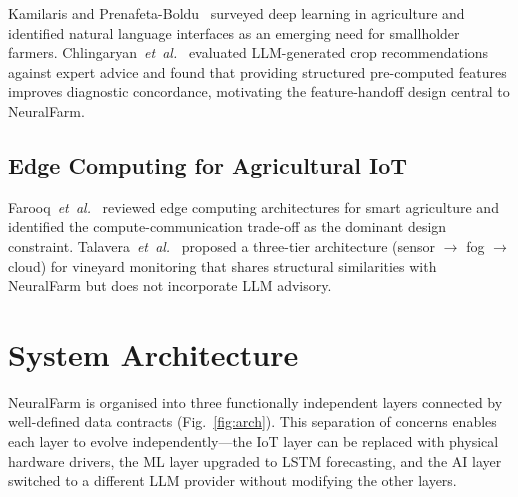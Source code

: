 \documentclass[journal,10pt,twocolumn]{IEEEtran}
\begin{document}
Kamilaris and Prenafeta-Boldu~\cite{Kamilaris2018} surveyed deep
learning in agriculture and identified natural language interfaces as an
emerging need for smallholder farmers.
Chlingaryan~\textit{et~al.}~\cite{Chlingaryan2018} evaluated
LLM-generated crop recommendations against expert advice and found that
providing structured pre-computed features improves diagnostic
concordance, motivating the feature-handoff design central to NeuralFarm.

\subsection{Edge Computing for Agricultural IoT}

Farooq~\textit{et~al.}~\cite{Farooq2020} reviewed edge computing
architectures for smart agriculture and identified the
compute-communication trade-off as the dominant design constraint.
Talavera~\textit{et~al.}~\cite{Talavera2017} proposed a three-tier
architecture (sensor $\to$ fog $\to$ cloud) for vineyard monitoring
that shares structural similarities with NeuralFarm but does not
incorporate LLM advisory.

\section{System Architecture}
\label{sec:arch}

NeuralFarm is organised into three functionally independent layers
connected by well-defined data contracts (Fig.~\ref{fig:arch}).
This separation of concerns enables each layer to evolve
independently---the IoT layer can be replaced with physical hardware
drivers, the ML layer upgraded to LSTM forecasting, and the AI layer
switched to a different LLM provider without modifying the other layers.
\end{document}
